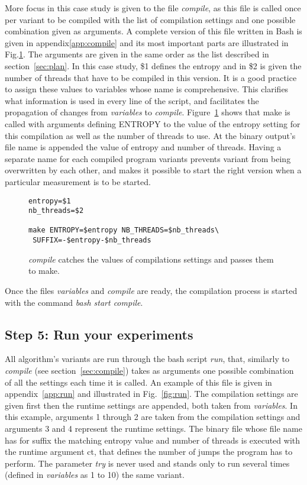 More focus in this case study is given to the file \emph{compile}, as this file is called once per variant to be compiled with the list of compilation settings and one possible combination given as arguments. A complete version of this file written in Bash is given in appendix\ref{app:compile} and its most important parts are illustrated in Fig.\ref{fig:compile}. The arguments are given in the same order as the list described in section~\ref{sec:plan}. In this case study, \$1 defines the entropy and in \$2 is given the number of threads that have to be compiled in this version. It is a good practice to assign these values to variables whose name is comprehensive. This clarifies what information is used in every line of the script, and facilitates the propagation of changes from \emph{variables} to \emph{compile}. Figure~\ref{fig:compile} shows that make is called with arguments defining {ENTROPY} to the value of the entropy setting for this compilation as well as the number of threads to use. At the binary output's file name is appended the value of entropy and number of threads. Having a separate name for each compiled program variants prevents variant from being overwritten by each other, and makes it possible to start the right version when a particular measurement is to be started.

\begin{figure}
\centering
\begin{lstlisting}
entropy=$1
nb_threads=$2

make ENTROPY=$entropy NB_THREADS=$nb_threads\
 SUFFIX=-$entropy-$nb_threads
\end{lstlisting}
\caption{\emph{compile} catches the values of compilations settings and passes them to make.}
\label{fig:compile}
\end{figure}

Once the files \emph{variables} and \emph{compile} are ready, the compilation process is started with the command \emph{bash start compile}.

\subsection{Step 5: Run your experiments}
\label{sec:run}
All algorithm's variants are run through the bash script \emph{run}, that, similarly to \emph{compile} (see section~\ref{sec:compile}) takes as arguments one possible combination of all the settings each time it is called. An example of this file is given in appendix~\ref{app:run} and illustrated in Fig.~\ref{fig:run}. The compilation settings are given first then the runtime settings are appended, both taken from \emph{variables}. In this example, arguments 1 through 2 are taken from the compilation settings and arguments 3 and 4 represent the runtime settings. The binary file whose file name has for suffix the matching entropy value and number of threads is executed with the runtime argument ct, that defines the number of jumps the program has to perform. The parameter \emph{try} is never used and stands only to run several times (defined in \emph{variables} as 1 to 10) the same variant.

